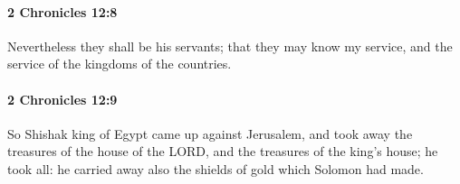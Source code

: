 		\paragraph{2 Chronicles 12:8} %
			\label{2CHRONICLES-12-8}

			Nevertheless they shall be his servants; that they may know my service, and the service of the kingdoms of the countries.


		\paragraph{2 Chronicles 12:9} %
			\label{2CHRONICLES-12-9}

			So Shishak king of Egypt came up against Jerusalem, and took away the treasures of the house of the LORD, and the treasures of the king's house; he took all: he carried away also the shields of gold which Solomon had made.


